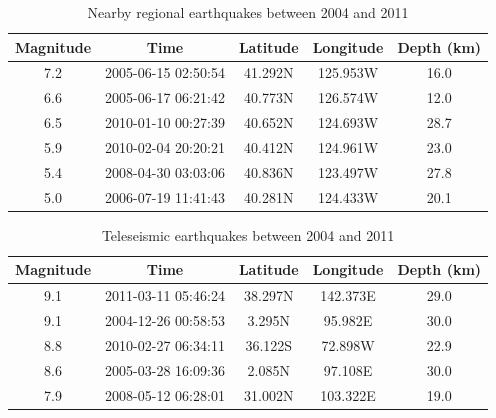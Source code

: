 \documentclass[draft]{agujournal2019}
\begin{document}
\begin{table}
\caption{Nearby regional earthquakes between 2004 and 2011}
\centering
\begin{tabular}{c c c c c}
\hline
Magnitude & Time & Latitude & Longitude & Depth (km) \\
\hline
7.2 & 2005-06-15 02:50:54 & 41.292N & 125.953W & 16.0 \\
6.6 & 2005-06-17 06:21:42 & 40.773N & 126.574W & 12.0 \\
6.5 & 2010-01-10 00:27:39 & 40.652N & 124.693W & 28.7 \\
5.9 & 2010-02-04 20:20:21 & 40.412N & 124.961W & 23.0 \\
5.4 & 2008-04-30 03:03:06 & 40.836N & 123.497W & 27.8 \\
5.0 & 2006-07-19 11:41:43 & 40.281N & 124.433W & 20.1 \\
\hline
\end{tabular}
\end{table}

\begin{table}
\caption{Teleseismic earthquakes between 2004 and 2011}
\centering
\begin{tabular}{c c c c c}
\hline
Magnitude & Time & Latitude & Longitude & Depth (km) \\
\hline
9.1 & 2011-03-11 05:46:24 & 38.297N & 142.373E & 29.0 \\
9.1 & 2004-12-26 00:58:53 & 3.295N & 95.982E & 30.0 \\
8.8 & 2010-02-27 06:34:11 & 36.122S & 72.898W & 22.9 \\ 
8.6 & 2005-03-28 16:09:36 & 2.085N & 97.108E & 30.0 \\ 
7.9 & 2008-05-12 06:28:01 & 31.002N & 103.322E & 19.0 \\ 
\hline
\end{tabular}
\end{table}
\end{document}
